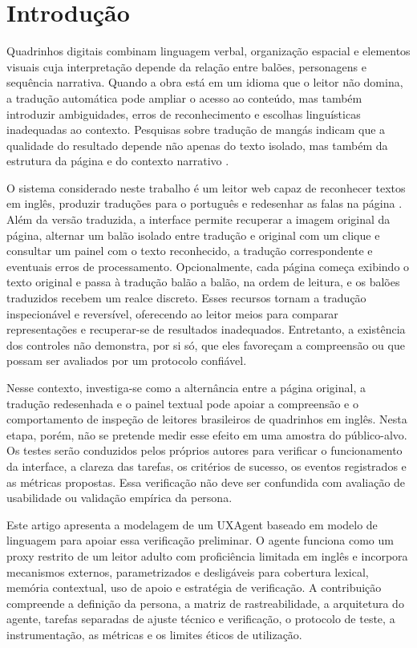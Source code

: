 \documentclass[conference]{IEEEtran}
\begin{document}
\section{Introdução}
Quadrinhos digitais combinam linguagem verbal, organização espacial e elementos visuais cuja interpretação depende da relação entre balões, personagens e sequência narrativa. Quando a obra está em um idioma que o leitor não domina, a tradução automática pode ampliar o acesso ao conteúdo, mas também introduzir ambiguidades, erros de reconhecimento e escolhas linguísticas inadequadas ao contexto. Pesquisas sobre tradução de mangás indicam que a qualidade do resultado depende não apenas do texto isolado, mas também da estrutura da página e do contexto narrativo \cite{hinami2021,kaino2024,sachdeva2024}.

O sistema considerado neste trabalho é um leitor web capaz de reconhecer textos em inglês, produzir traduções para o português e redesenhar as falas na página \cite{forkrepo}. Além da versão traduzida, a interface permite recuperar a imagem original da página, alternar um balão isolado entre tradução e original com um clique e consultar um painel com o texto reconhecido, a tradução correspondente e eventuais erros de processamento. Opcionalmente, cada página começa exibindo o texto original e passa à tradução balão a balão, na ordem de leitura, e os balões traduzidos recebem um realce discreto. Esses recursos tornam a tradução inspecionável e reversível, oferecendo ao leitor meios para comparar representações e recuperar-se de resultados inadequados. Entretanto, a existência dos controles não demonstra, por si só, que eles favoreçam a compreensão ou que possam ser avaliados por um protocolo confiável.

Nesse contexto, investiga-se como a alternância entre a página original, a tradução redesenhada e o painel textual pode apoiar a compreensão e o comportamento de inspeção de leitores brasileiros de quadrinhos em inglês. Nesta etapa, porém, não se pretende medir esse efeito em uma amostra do público-alvo. Os testes serão conduzidos pelos próprios autores para verificar o funcionamento da interface, a clareza das tarefas, os critérios de sucesso, os eventos registrados e as métricas propostas. Essa verificação não deve ser confundida com avaliação de usabilidade ou validação empírica da persona.

Este artigo apresenta a modelagem de um UXAgent baseado em modelo de linguagem para apoiar essa verificação preliminar. O agente funciona como um proxy restrito de um leitor adulto com proficiência limitada em inglês e incorpora mecanismos externos, parametrizados e desligáveis para cobertura lexical, memória contextual, uso de apoio e estratégia de verificação. A contribuição compreende a definição da persona, a matriz de rastreabilidade, a arquitetura do agente, tarefas separadas de ajuste técnico e verificação, o protocolo de teste, a instrumentação, as métricas e os limites éticos de utilização.
\end{document}

